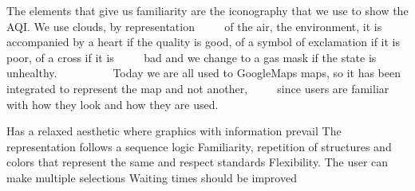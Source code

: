         The elements that give us familiarity are the iconography that we use to show the AQI. We use clouds, by representation
             of the air, the environment, it is accompanied by a heart if the quality is good, of a symbol of exclamation if it is poor, of a cross if it is
             bad and we change to a gas mask if the state is unhealthy.
            
             Today we are all used to GoogleMaps maps, so it has been integrated to represent the map and not another,
             since users are familiar with how they look and how they are used.      





\begin{itemize}
    \done Has a relaxed aesthetic where graphics with information prevail
   \done The representation follows a sequence logic
    \done Familiarity, repetition of structures and colors that represent the same and respect standards
    \done Flexibility. The user can make multiple selections
    \crossed Waiting times should be improved
    
\end{itemize}
\newpage